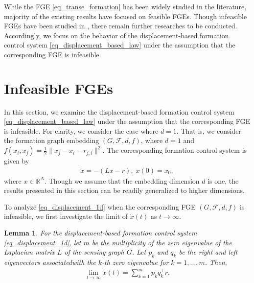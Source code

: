 \documentclass{ifacconf}
\newtheorem{lemma}{Lemma}[section]
\begin{document}
While the FGE \eqref{eq_transe_formation} has been widely studied in the literature, majority of the existing results have focused on feasible FGEs. Though infeasible FGEs have been studied in \cite{dimarogonas2008connection}, there remain further researches to be conducted. Accordingly, we focus on the behavior of the displacement-based formation control system \eqref{eq_displacement_based_law} under the assumption that the corresponding FGE is infeasible.


\section{Infeasible FGEs} \label{sec_infeasible}

In this section, we examine the displacement-based formation control system \eqref{eq_displacement_based_law} under the assumption that the corresponding FGE is infeasible. For clarity, we consider the case where $ d = 1 $. That is, we consider the formation graph embedding $(G,\mathcal{F},d,f)$, where $d=1$ and $f(x_i,x_j) = \frac{1}{2}\| x_j-x_i-r_{j,i} \|^2$. The corresponding formation control system is given by 
\begin{align} \label{eq_displacement_1d}
\dot{x} = -(Lx - r), \; x(0) = x_0,
\end{align}
where $x \in \mathbb{R}^N$. Though we assume that the embedding dimension $d$ is one, the results presented in this section can be readily generalized to higher dimensions.

To analyze \eqref{eq_displacement_1d} when the corresponding FGE $(G,\mathcal{F},d,f)$ is infeasible, we first investigate the limit of $\dot{x}(t)$ as $t \to \infty$.
\begin{lemma} \label{lemma_1}
For the displacement-based formation control system \eqref{eq_displacement_1d}, let $m$ be the multiplicity of the zero eigenvalue of the Laplacian matrix $L$ of the sensing graph $G$. Let $p_k$ and $q_k$ be the right and left eigenvectors associatedwith the $k$-th zero eigenvalue for $k = 1,\ldots,m$. Then,
\begin{align*}
    \lim_{t\rightarrow \infty} \dot{x}(t) = \sum_{k=1}^m p_k q_k^\top r.
\end{align*}
\end{lemma}
\end{document}
